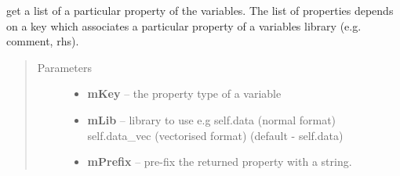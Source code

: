 \documentclass[letterpaper,10pt,english]{sphinxmanual}
\begin{document}
\begin{fulllineitems}
\begin{fulllineitems}
\label{eqparse:eqparse.baseparse.BaseParse.close_file}
\end{fulllineitems}


\begin{fulllineitems}
\label{eqparse:eqparse.baseparse.BaseParse.end}
\end{fulllineitems}


\begin{fulllineitems}
\label{eqparse:eqparse.baseparse.BaseParse.get_directory}
\end{fulllineitems}


\begin{fulllineitems}
\label{eqparse:eqparse.baseparse.BaseParse.get_index}
\end{fulllineitems}


\begin{fulllineitems}
\label{eqparse:eqparse.baseparse.BaseParse.get_list}
get a list of a particular property of the variables. The list of properties depends on a key which associates a particular property of a variables library (e.g. comment, rhs).
\begin{quote}\begin{description}
\item[{Parameters}] \leavevmode\begin{itemize}
\item {} 
\textbf{mKey} -- the property type of a variable

\item {} 
\textbf{mLib} -- library to use e.g self.data (normal format) self.data\_vec (vectorised format) (default - self.data)

\item {} 
\textbf{mPrefix} -- pre-fix the returned property with a string.


\end{itemize}
\end{description}
\end{quote}
\end{fulllineitems}
\end{fulllineitems}
\end{document}
